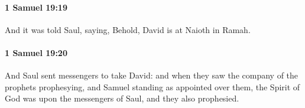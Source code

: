 		\paragraph{1 Samuel 19:19} %
			\label{1SAMUEL-19-19}

			And it was told Saul, saying, Behold, David is at Naioth in Ramah.


		\paragraph{1 Samuel 19:20} %
			\label{1SAMUEL-19-20}

			And Saul sent messengers to take David: and when they saw the company of the prophets prophesying, and Samuel standing as appointed over them, the Spirit of God was upon the messengers of Saul, and they also prophesied.


